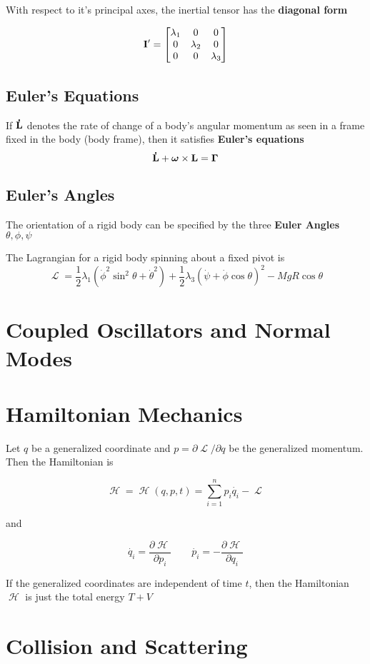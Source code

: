 \documentclass{article}
\DeclareMathOperator{\Lagr}{\mathcal{L}}
\DeclareMathOperator{\Ham}{\mathcal{H}}
\begin{document}
With respect to it's principal axes, the inertial tensor has the \textbf{diagonal form}

$$
\vb{I'} = \begin{bmatrix}
    \lambda_1 & 0 & 0 \\
    0 & \lambda_2 & 0 \\
    0 & 0 & \lambda_3 \\
  \end{bmatrix}
$$
\subsection*{Euler's Equations}
If $\vb{\dot{L}}$ denotes the rate of change of a body's angular momentum as seen in a frame fixed in the body (body frame), then it satisfies \textbf{Euler's equations}
$$
\vb{\dot{L}} + \bm \omega \times \vb{L} = \bm \Gamma
$$
\subsection*{Euler's Angles}
The orientation of a rigid body can be specified by the three \textbf{Euler Angles} $\theta, \phi, \psi$ 

The Lagrangian for a rigid body spinning about a fixed pivot is
$$
\Lagr = \frac{1}{2} \lambda_1 (\dot\phi^2 \sin^2\theta + \dot\theta^2) + \frac{1}{2} \lambda_3(\dot\psi + \dot\phi \cos\theta)^2 - M g R \cos\theta
$$

\section{Coupled Oscillators and Normal Modes}

\section{Hamiltonian Mechanics}
Let $q$ be a generalized coordinate and $p = \partial \Lagr / \partial q$ be the generalized momentum.  Then the Hamiltonian is

$$\Ham = \Ham(q,p,t) = \sum_{i=1}^{n} p_i \dot{q_i} - \Lagr $$

and

$$
\dot{q_i} = \frac{\partial \Ham}{\partial p_i} \qquad \dot{p_i} = - \frac{\partial \Ham}{\partial q_i} 
$$

If the generalized coordinates are independent of time $t$, then the Hamiltonian $\Ham$ is just the total energy $T + V$

\section{Collision and Scattering}
\end{document}
